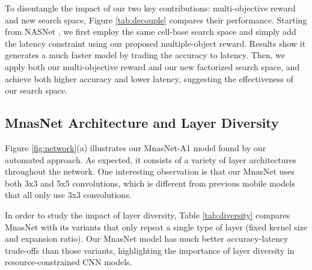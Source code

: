 \documentclass[10pt,twocolumn,letterpaper]{article}
\begin{document}
To disentangle the impact of our two key contributions: multi-objective reward and new search space, Figure \ref{tab:decouple} compares their performance. Starting from NASNet \cite{nas_imagenet18}, we first employ the same cell-base search space \cite{nas_imagenet18} and simply add the latency constraint using our proposed multiple-object reward. Results show it generates a much faster model by trading the accuracy to latency.  Then, we apply both our multi-objective reward and our new factorized search space, and achieve both higher accuracy and lower latency, suggesting the effectiveness of our search space.
%
\begin{table}[h]
  \centering
  \caption{ --  denotes our multi-objective reward;  denotes only optimizing accuracy.}
  \label{tab:decouple}
\end{table} 
\subsection{MnasNet Architecture and Layer Diversity}



Figure \ref{fig:network}(a) illustrates our MnasNet-A1 model found by our automated approach. As expected, it consists of a variety of layer architectures throughout the network. One interesting observation is that our MnasNet uses both 3x3 and 5x5 convolutions, which is different from previous mobile models that all only use 3x3 convolutions.

In order to study the impact of layer diversity, Table \ref{tab:diversity} compares MnasNet  with its variants that only repeat a single type of layer (fixed kernel size and expansion ratio). Our MnasNet model has much better accuracy-latency trade-offs than those variants, highlighting the importance of layer diversity in resource-constrained CNN models. 
\end{document}
